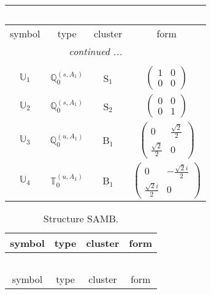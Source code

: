 \documentclass[fleqn,10pt,landscape]{article}
\begin{document}
\begin{itemize}
\begin{center}
\begin{longtable}{c|c|c|c}
\multicolumn{3}{l}{\tablename\ \thetable{}} \\
 \hline \hline
symbol & type & cluster & form \\ \hline \endhead

 \hline \hline
\multicolumn{3}{r}{\footnotesize\it continued ...} \\ \endfoot

 \hline \hline
\multicolumn{3}{r}{} \\ \endlastfoot

$ \mathbb{U}_{1} $ & $\mathbb{Q}_{0}^{(s,A_{1})}$ & S$_{1}$ & $\begin{pmatrix} 1 & 0 \\ 0 & 0 \end{pmatrix}$ \\ \hline
$ \mathbb{U}_{2} $ & $\mathbb{Q}_{0}^{(s,A_{1})}$ & S$_{2}$ & $\begin{pmatrix} 0 & 0 \\ 0 & 1 \end{pmatrix}$ \\ \hline
$ \mathbb{U}_{3} $ & $\mathbb{Q}_{0}^{(u,A_{1})}$ & B$_{1}$ & $\begin{pmatrix} 0 & \frac{\sqrt{2}}{2} \\ \frac{\sqrt{2}}{2} & 0 \end{pmatrix}$ \\
$ \mathbb{U}_{4} $ & $\mathbb{T}_{0}^{(u,A_{1})}$ & B$_{1}$ & $\begin{pmatrix} 0 & - \frac{\sqrt{2} i}{2} \\ \frac{\sqrt{2} i}{2} & 0 \end{pmatrix}$ \\
\end{longtable}
\end{center}
\begin{center}
\renewcommand{\arraystretch}{1.3}
\begin{longtable}{c|c|c|c}
\caption{Structure SAMB.}
 \\
 \hline \hline
symbol & type & cluster & form \\ \hline \endfirsthead

\multicolumn{3}{l}{\tablename\ \thetable{}} \\
 \hline \hline
symbol & type & cluster & form \\ \hline \endhead


\end{longtable}
\end{center}
\end{itemize}
\end{document}
